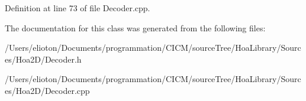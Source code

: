 Definition at line 73 of file Decoder.\-cpp.



The documentation for this class was generated from the following files\-:\begin{DoxyCompactItemize}
\item 
/\-Users/elioton/\-Documents/programmation/\-C\-I\-C\-M/source\-Tree/\-Hoa\-Library/\-Sources/\-Hoa2\-D/Decoder.\-h\item 
/\-Users/elioton/\-Documents/programmation/\-C\-I\-C\-M/source\-Tree/\-Hoa\-Library/\-Sources/\-Hoa2\-D/Decoder.\-cpp\end{DoxyCompactItemize}
